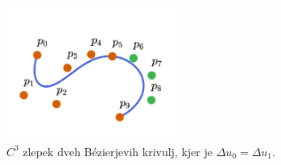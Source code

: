 \documentclass[isrm2, tisk]{fmfdelo}
\begin{document}
    \begin{figure}[h]
        \centering
        \includegraphics[width = 0.50\textwidth]{images/zlepek-c3}
        \caption{$C^3$ zlepek dveh Bézierjevih krivulj, kjer je $\Delta u_0=\Delta u_1$.}
        \label{fig:zlepek-c3}
    \end{figure}
    \newpage
\end{document}

